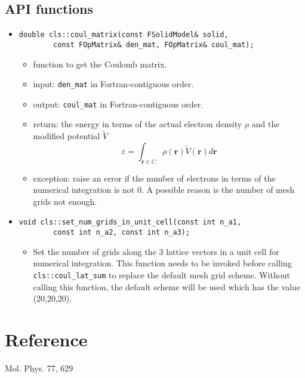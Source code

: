 \documentclass{article}
\begin{document}
\subsection{API functions}
\begin{itemize}
\item
\begin{verbatim}
double cls::coul_matrix(const FSolidModel& solid,
        const FOpMatrix& den_mat, FOpMatrix& coul_mat);
\end{verbatim}
\begin{itemize}
  \item function to get the Coulomb matrix.
  \item input: \verb$den_mat$ in Fortran-contiguous order.
  \item output: \verb$coul_mat$ in Fortran-contiguous order.
  \item return: the energy in terms of the actual electron density $\rho$ and
    the modified potential $\tilde{V}$
    \begin{equation}
      \varepsilon = \int_{\mathbf{r}\in C} \rho(\mathbf{r})\tilde{V}(\mathbf{r}) d\mathbf{r}
      \label{}
    \end{equation}
  \item exception: raise an error if the number of electrons in terms of the
    numerical integration is not 0.  A possible reason is the number of
    mesh grids not enough.
\end{itemize}
%
\item 
\begin{verbatim}
void cls::set_num_grids_in_unit_cell(const int n_a1,
        const int n_a2, const int n_a3);
\end{verbatim}
\begin{itemize}
  \item Set the number of grids along the 3 lattice vectors in a unit cell for
    numerical integration.
    This function needs to be invoked before calling \verb$cls::coul_lat_sum$
    to replace the default mesh grid scheme.
    Without calling this function, the default scheme will be used which has
    the value (20,20,20).
\end{itemize}
\end{itemize}

\section{Reference}
Mol. Phys. 77, 629
\end{document}
